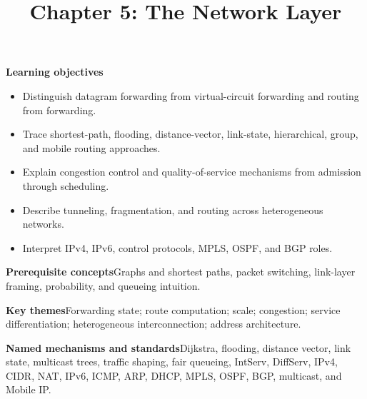 \documentclass[10pt,letterpaper]{article}
\title{Chapter 5: The Network Layer}
\author{}
\date{}
\begin{document}
\maketitle
{}
\begin{overviewbox}
\textbf{Learning objectives}\begin{itemize}
  \item Distinguish datagram forwarding from virtual-circuit forwarding and routing from forwarding.
  \item Trace shortest-path, flooding, distance-vector, link-state, hierarchical, group, and mobile routing approaches.
  \item Explain congestion control and quality-of-service mechanisms from admission through scheduling.
  \item Describe tunneling, fragmentation, and routing across heterogeneous networks.
  \item Interpret IPv4, IPv6, control protocols, MPLS, OSPF, and BGP roles.
\end{itemize}
\textbf{Prerequisite concepts}\quad Graphs and shortest paths, packet switching, link-layer framing, probability, and queueing intuition.\par
\textbf{Key themes}\quad Forwarding state; route computation; scale; congestion; service differentiation; heterogeneous interconnection; address architecture.\par
\textbf{Named mechanisms and standards}\quad Dijkstra, flooding, distance vector, link state, multicast trees, traffic shaping, fair queueing, IntServ, DiffServ, IPv4, CIDR, NAT, IPv6, ICMP, ARP, DHCP, MPLS, OSPF, BGP, multicast, and Mobile IP.
\end{overviewbox}

\end{document}
